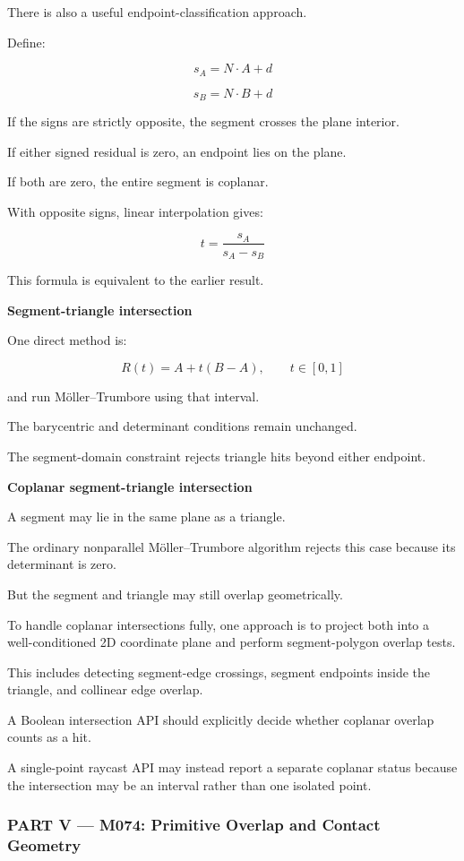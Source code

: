 There is also a useful endpoint-classification approach.

Define:

\[
s_A=N\cdot A+d
\]

\[
s_B=N\cdot B+d
\]

If the signs are strictly opposite, the segment crosses the plane interior.

If either signed residual is zero, an endpoint lies on the plane.

If both are zero, the entire segment is coplanar.

With opposite signs, linear interpolation gives:

\[
\boxed{ t=\frac{s_A}{s_A-s_B} }
\]

This formula is equivalent to the earlier result.

\textbf{Segment-triangle intersection}

One direct method is:

\[
R(t)=A+t(B-A),\qquad t\in[0,1]
\]

and run Möller--Trumbore using that interval.

The barycentric and determinant conditions remain unchanged.

The segment-domain constraint rejects triangle hits beyond either endpoint.

\textbf{Coplanar segment-triangle intersection}

A segment may lie in the same plane as a triangle.

The ordinary nonparallel Möller--Trumbore algorithm rejects this case because its determinant is zero.

But the segment and triangle may still overlap geometrically.

To handle coplanar intersections fully, one approach is to project both into a well-conditioned 2D coordinate plane and perform segment-polygon overlap tests.

This includes detecting segment-edge crossings, segment endpoints inside the triangle, and collinear edge overlap.

A Boolean intersection API should explicitly decide whether coplanar overlap counts as a hit.

A single-point raycast API may instead report a separate coplanar status because the intersection may be an interval rather than one isolated point.

\subsubsection{PART V --- M074: Primitive Overlap and Contact Geometry}\label{part-v-m074-primitive-overlap-and-contact-geometry}

